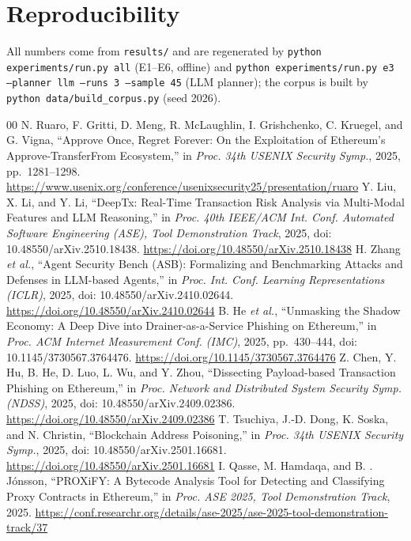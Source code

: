 \documentclass[conference]{IEEEtran}
\begin{document}
\section*{Reproducibility}
All numbers come from \texttt{results/} and are regenerated by
\texttt{python experiments/run.py all} (E1--E6, offline) and
\texttt{python experiments/run.py e3 --planner llm --runs 3 --sample 45} (LLM
planner); the corpus is built by \texttt{python data/build\_corpus.py} (seed 2026).

\begin{thebibliography}{00}
 N. Ruaro, F. Gritti, D. Meng, R. McLaughlin, I. Grishchenko, C. Kruegel, and G. Vigna, ``Approve Once, Regret Forever: On the Exploitation of Ethereum's Approve-TransferFrom Ecosystem,'' in \textit{Proc. 34th USENIX Security Symp.}, 2025, pp.\ 1281--1298. \url{https://www.usenix.org/conference/usenixsecurity25/presentation/ruaro}
 Y. Liu, X. Li, and Y. Li, ``DeepTx: Real-Time Transaction Risk Analysis via Multi-Modal Features and LLM Reasoning,'' in \textit{Proc. 40th IEEE/ACM Int. Conf. Automated Software Engineering (ASE), Tool Demonstration Track}, 2025, doi: 10.48550/arXiv.2510.18438. \url{https://doi.org/10.48550/arXiv.2510.18438}
 H. Zhang \textit{et al.}, ``Agent Security Bench (ASB): Formalizing and Benchmarking Attacks and Defenses in LLM-based Agents,'' in \textit{Proc. Int. Conf. Learning Representations (ICLR)}, 2025, doi: 10.48550/arXiv.2410.02644. \url{https://doi.org/10.48550/arXiv.2410.02644}
 B. He \textit{et al.}, ``Unmasking the Shadow Economy: A Deep Dive into Drainer-as-a-Service Phishing on Ethereum,'' in \textit{Proc. ACM Internet Measurement Conf. (IMC)}, 2025, pp.\ 430--444, doi: 10.1145/3730567.3764476. \url{https://doi.org/10.1145/3730567.3764476}
 Z. Chen, Y. Hu, B. He, D. Luo, L. Wu, and Y. Zhou, ``Dissecting Payload-based Transaction Phishing on Ethereum,'' in \textit{Proc. Network and Distributed System Security Symp. (NDSS)}, 2025, doi: 10.48550/arXiv.2409.02386. \url{https://doi.org/10.48550/arXiv.2409.02386}
 T. Tsuchiya, J.-D. Dong, K. Soska, and N. Christin, ``Blockchain Address Poisoning,'' in \textit{Proc. 34th USENIX Security Symp.}, 2025, doi: 10.48550/arXiv.2501.16681. \url{https://doi.org/10.48550/arXiv.2501.16681}
 I. Qasse, M. Hamdaqa, and B. {\TH}. J{\'o}nsson, ``PROXiFY: A Bytecode Analysis Tool for Detecting and Classifying Proxy Contracts in Ethereum,'' in \textit{Proc. ASE 2025, Tool Demonstration Track}, 2025. \url{https://conf.researchr.org/details/ase-2025/ase-2025-tool-demonstration-track/37}

\end{thebibliography}
\end{document}
